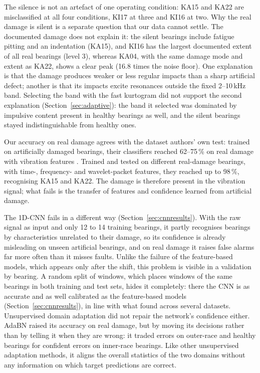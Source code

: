 The silence is not an artefact of one operating condition: KA15 and KA22 are misclassified at all four conditions,
KI17 at three and KI16 at two. Why the real damage is silent is a separate question that our data cannot settle. The documented
damage does not explain it: the silent bearings include fatigue pitting and an indentation (KA15), and KI16 has the
largest documented extent of all real bearings (level 3), whereas KA04, with the same damage mode and extent as KA22,
shows a clear peak (16.8 times the noise floor). One
explanation is that the damage produces weaker or less regular impacts than a sharp artificial defect; another is
that its impacts excite resonances outside the fixed 2--10\,kHz band. Selecting the band with the fast kurtogram did not
support the second explanation (Section~\ref{sec:adaptive}): the band it selected was dominated by impulsive content
present in healthy bearings as well, and the silent bearings stayed indistinguishable from healthy ones.

Our accuracy on real damage agrees with the dataset authors' own test: trained on artificially damaged bearings, their
classifiers reached 62--75\,\% on real damage with vibration features \citep{lessmeier2016}. Trained and tested on
different real-damage bearings, with time-, frequency- and wavelet-packet features, they reached up to 98\,\%,
recognising KA15 and KA22. The damage is therefore present in the vibration signal; what fails is the transfer of
features and confidence learned from artificial damage.

The 1D-CNN fails in a different way (Section~\ref{sec:cnnresults}). With the raw signal as input and only 12 to 14
training bearings, it partly recognises bearings by characteristics unrelated to their damage, so its confidence is
already misleading on unseen artificial bearings, and on real damage it raises false alarms far more often than it
misses faults. Unlike the failure of the feature-based models, which appears only after the shift, this problem is
visible in a validation by bearing. A random split of windows, which places windows of the same bearings in both
training and test sets, hides it completely: there the CNN is as accurate and as well calibrated as the feature-based
models (Section~\ref{sec:cnnresults}), in line with what \citet{vieira2026} found across several datasets.
Unsupervised domain adaptation did not repair the network's confidence either. AdaBN raised its accuracy on real
damage, but by moving its decisions rather than by telling it when they are wrong: it traded errors on outer-race and
healthy bearings for confident errors on inner-race bearings. Like other unsupervised adaptation methods, it aligns
the overall statistics of the two domains without any information on which target predictions are correct.

